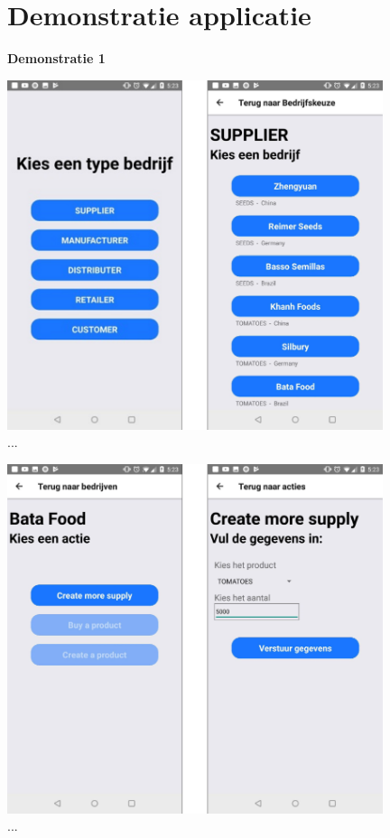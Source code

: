 \section{Demonstratie applicatie}
\textbf{Demonstratie 1}
\begin{center}
	\includegraphics[width=11cm]{img/react-demo-1-1}\\[1cm]
	...
\end{center}

\begin{center}
	\includegraphics[width=11cm]{img/react-demo-1-2}\\[1cm]
	...
\end{center}

